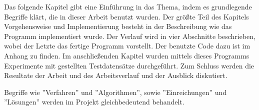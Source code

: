 Das folgende Kapitel gibt eine Einführung in das Thema, indem es grundlegende Begriffe klärt, die in dieser Arbeit benutzt wurden. Der größte Teil des Kapitels Vorgehensweise und Implementierung besteht in der Beschreibung wie das Programm implementiert wurde. Der Verlauf wird in vier Abschnitte beschrieben, wobei der Letzte das fertige Programm vorstellt. Der benutzte Code dazu ist im Anhang zu finden. Im anschließenden Kapitel wurden mittels dieses Programms Experimente mit gestellten Testdatensätze durchgeführt. Zum Schluss werden die Resultate der Arbeit und des Arbeitsverlauf und der Ausblick diskutiert.

Begriffe wie ''Verfahren'' und ''Algorithmen'', sowie ''Einreichungen'' und ''Lösungen'' werden im Projekt gleichbedeutend behandelt.